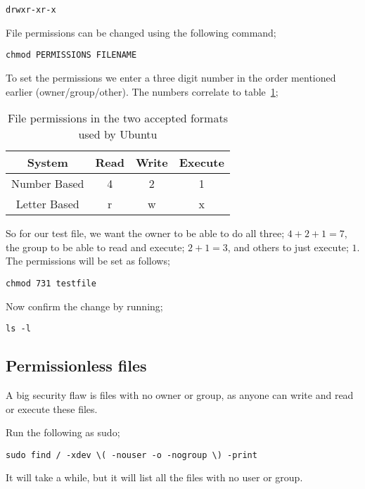 \begin{verbatim}
drwxr-xr-x
\end{verbatim}

File permissions can be changed using the following command;

\begin{lstlisting}
chmod PERMISSIONS FILENAME
\end{lstlisting}

To set the permissions we enter a three digit number in the order mentioned earlier (owner/group/other).  The numbers correlate to table~\ref{tab:permissions};

\begin{table}[!th]
\centering
\begin{tabular}{cccc}
\hline
System & Read & Write & Execute\\
\hline
Number Based & 4 & 2 & 1\\
Letter Based & r & w & x\\
\hline
\end{tabular}
\caption{File permissions in the two accepted formats used by Ubuntu}
\label{tab:permissions}
\end{table}

So for our test file, we want the owner to be able to do all three; $4+2+1=7$, the group to be able to read and execute; $2+1=3$, and others to just execute; $1$.  The permissions will be set as follows;

\begin{lstlisting}
chmod 731 testfile
\end{lstlisting}

Now confirm the change by running;

\begin{lstlisting}
ls -l
\end{lstlisting}

\subsection{Permissionless files}

A big security flaw is files with no owner or group, as anyone can write and read or execute these files.

Run the following as sudo;

\begin{lstlisting}
sudo find / -xdev \( -nouser -o -nogroup \) -print
\end{lstlisting}

It will take a while, but it will list all the files with no user or group.



